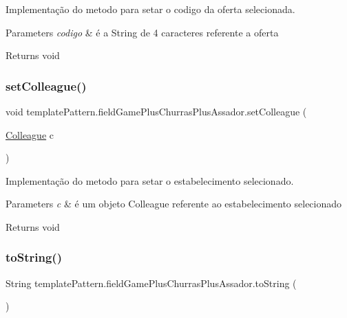 Implementação do metodo para setar o codigo da oferta selecionada. 


\begin{DoxyParams}{Parameters}
{\em codigo} & é a String de 4 caracteres referente a oferta \\
\hline
\end{DoxyParams}
\begin{DoxyReturn}{Returns}
void 
\end{DoxyReturn}
\mbox{\label{classtemplate_pattern_1_1field_game_plus_churras_plus_assador_ae17580cf366fa5fd02bce25342d7d028}} 
\subsubsection{\texorpdfstring{setColleague()}{setColleague()}}
{\footnotesize\ttfamily void template\+Pattern.\+field\+Game\+Plus\+Churras\+Plus\+Assador.\+set\+Colleague (\begin{DoxyParamCaption}\item[{\mbox{\hyperlink{classmediator_pattern_1_1_colleague}{Colleague}}}]{c }\end{DoxyParamCaption})}



Implementação do metodo para setar o estabelecimento selecionado. 


\begin{DoxyParams}{Parameters}
{\em c} & é um objeto Colleague referente ao estabelecimento selecionado \\
\hline
\end{DoxyParams}
\begin{DoxyReturn}{Returns}
void 
\end{DoxyReturn}
\mbox{\label{classtemplate_pattern_1_1field_game_plus_churras_plus_assador_a7d10c5cc0fdd9d10073b0b156739b170}} 
\subsubsection{\texorpdfstring{toString()}{toString()}}
{\footnotesize\ttfamily String template\+Pattern.\+field\+Game\+Plus\+Churras\+Plus\+Assador.\+to\+String (\begin{DoxyParamCaption}{ }\end{DoxyParamCaption})}



